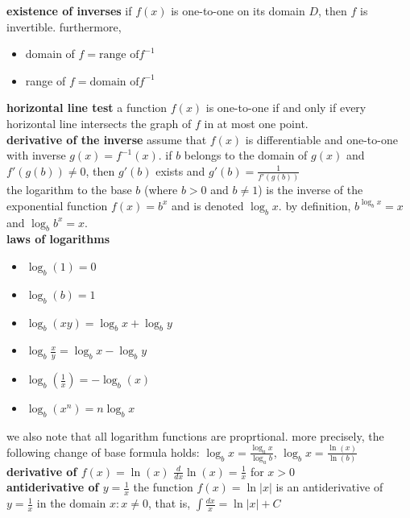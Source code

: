 \documentclass{article}
\begin{document}
\textbf{existence of inverses} if $f(x)$ is one-to-one on its domain $D$, then $f$ is invertible. furthermore,
	\begin{itemize}
		\item domain of $f = \text{range of} f^{-1}$
		\item range of $f = \text{domain of} f^{-1}$ 
	\end{itemize}

\textbf{horizontal line test} a function $f(x)$ is one-to-one if and only if every horizontal line intersects the graph of $f$ in at most one point.\\

\textbf{derivative of the inverse} assume that $f(x)$ is differentiable and one-to-one with inverse $g(x) = f^{-1}(x)$. if $b$ belongs to the domain of $g(x)$ and $f'(g(b)) \neq 0$, then $g'(b)$ exists and $g'(b) = \frac{1}{f'(g(b))}$\\

the logarithm to the base $b$ (where $b > 0$ and $b \neq 1$) is the inverse of the exponential function $f(x) = b^x$ and is denoted $\log_{b}x$. by definition, $b^{\log_{b}x} = x$ and $\log_{b}b^x = x$.\\

\textbf{laws of logarithms}
	\begin{itemize}
		\item $\log_{b}(1) = 0$
		\item $\log_{b}(b) = 1$
		\item $\log_{b}(xy) = \log_{b}x + \log_{b}y$
		\item $\log_{b}\frac{x}{y} = \log_{b}x - \log_{b}y$
		\item $\log_{b}(\frac{1}{x}) = -\log_{b}(x)$
		\item $\log_{b}(x^n) = n\log_{b}x$
	\end{itemize}
we also note that all logarithm functions are proprtional. more precisely, the following change of base formula holds: $\log_{b}x = \frac{\log_{a}x}{\log_{a}b}$, $\log_{b}x = \frac{\ln(x)}{\ln(b)}$\\

\textbf{derivative of $f(x) = \ln(x)$} $\frac{d}{dx}\ln(x) = \frac{1}{x}$ for $x > 0$\\

\textbf{antiderivative of $y = \frac{1}{x}$} the function $f(x) = \ln \lvert x\rvert$ is an antiderivative of $y = \frac{1}{x}$ in the domain ${x : x \neq 0}$, that is, $\int\frac{dx}{x} = \ln \lvert x \rvert + C$\\
\end{document}
